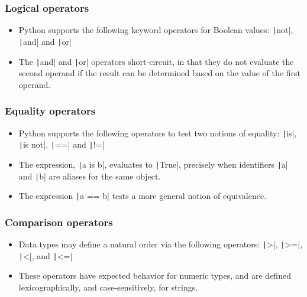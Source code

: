 \begin{frame}
    \frametitle{Logical operators}

    \begin{itemize}
        \item Python supports the following keyword operators for Boolean values: \texttt|not|, \texttt|and| and \texttt|or|
        \item The \texttt|and| and \texttt|or| operators short-circuit, in that they do not evaluate the second operand if the result can be determined based on the value of the first operand.

    \end{itemize}

\end{frame}

\begin{frame}
    \frametitle{Equality operators}

    \begin{itemize}
        \item Python supports the following operators to test two notions of equality: \texttt|is|, \texttt|is not|, \texttt|==| and \texttt|!=|
        \item The expression, \texttt|a is b|, evaluates to \texttt|True|, precisely when identifiers \texttt|a| and \texttt|b| are aliases for the same object.
        \item The expression \texttt|a == b| tests a more general notion of equivalence.

    \end{itemize}

\end{frame}

\begin{frame}
    \frametitle{Comparison operators}

    \begin{itemize}
        \item Data types may define a natural order via the following operators: \texttt|>|, \texttt|>=|, \texttt|<|, and \texttt|<=|
        \item These operators have expected behavior for numeric types, and are defined lexicographically, and case-sensitively, for strings.
    \end{itemize}

\end{frame}

